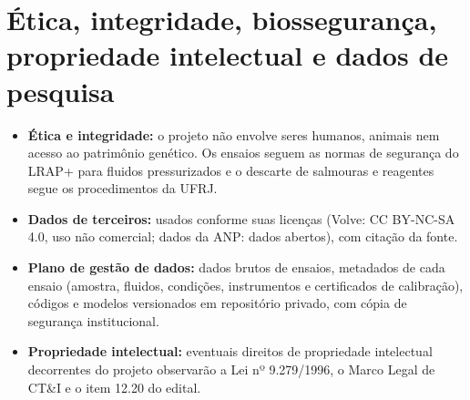 \documentclass[10pt,a4paper]{article}
\newcommand{\itemedital}[1]{}
\begin{document}
\section{Ética, integridade, biossegurança, propriedade intelectual e dados de pesquisa}\label{sec:etica}\itemedital{2.16 XXVI; 12.20}
\begin{itemize}
  \item \textbf{Ética e integridade:} o projeto não envolve seres humanos, animais nem acesso ao
        patrimônio genético. Os ensaios seguem as normas de segurança do LRAP+ para fluidos
        pressurizados e o descarte de salmouras e reagentes segue os procedimentos da UFRJ.
  \item \textbf{Dados de terceiros:} usados conforme suas licenças (Volve: CC BY-NC-SA 4.0,
        uso não comercial; dados da ANP: dados abertos), com citação da fonte.
  \item \textbf{Plano de gestão de dados:} dados brutos de ensaios, metadados de cada ensaio
        (amostra, fluidos, condições, instrumentos e certificados de calibração), códigos e
        modelos versionados em repositório privado, com cópia de segurança institucional.
  \item \textbf{Propriedade intelectual:} eventuais direitos de propriedade intelectual
        decorrentes do projeto observarão a Lei nº 9.279/1996, o Marco Legal de CT\&I e o
        item 12.20 do edital.
\end{itemize}

{\scriptsize
\setlength{\bibsep}{0pt}



}
\end{document}
